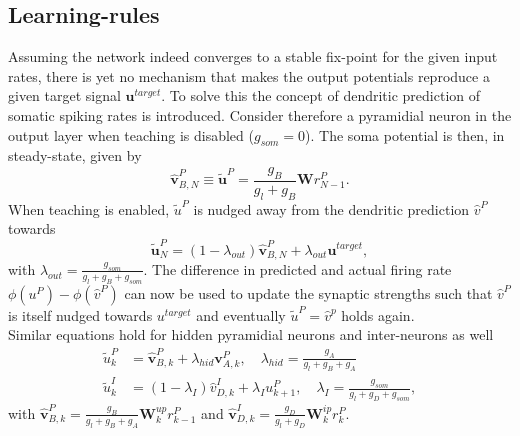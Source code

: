 \documentclass[12pt,a4paper]{article}
\begin{document}
\subsection{Learning-rules}
Assuming the network indeed converges to a stable fix-point for the given input rates, there is yet no mechanism that makes the output potentials reproduce a given target signal $\bm{u}^{target}$. To solve this the concept of dendritic prediction of somatic spiking rates is introduced. Consider therefore a pyramidial neuron in the output layer when teaching is disabled ($g_{som}=0$). The soma potential is then, in steady-state, given by
\begin{equation}
\hat{\bm{v}}^P_{B,N} \equiv \tilde{\bm{u}}^P = \frac{g_B}{g_l + g_B}\bm{W}r^P_{N-1}.
\end{equation} 
When teaching is enabled, $\tilde{u}^P$ is nudged away from the dendritic prediction $\hat{v}^P$ towards
\begin{equation}
\tilde{\bm{u}}^P_N = (1-\lambda_{out})\hat{\bm{v}}^P_{B,N} + \lambda_{out}\bm{u}^{target},
\end{equation}
with $\lambda_{out} = \frac{g_{som}}{g_l + g_B + g_{som}}$.
The difference in predicted and actual firing rate $\phi(u^P) - \phi(\hat{v}^P)$ can now be used to update the synaptic strengths such that $\hat{v}^P$ is itself nudged towards $u^{target}$ and eventually $\tilde{u}^P = \hat{v}^p$ holds again.\\
Similar equations hold for hidden pyramidial neurons and inter-neurons as well
\begin{align}
\tilde{u}^P_k &= \hat{\bm{v}}^P_{B,k} + \lambda_{hid}\bm{v}^P_{A,k}, \quad \lambda_{hid} = \frac{g_A}{g_l + g_B + g_A}\\
\tilde{u}^I_k &= (1-\lambda_I)\hat{v}^I_{D,k} + \lambda_{I}u^P_{k+1}, \quad \lambda_{I} = \frac{g_{som}}{g_l + g_D + g_{som}},
\end{align}
with $\hat{\bm{v}}^P_{B,k} = \frac{g_B}{g_l + g_B + g_A}\bm{W}^{up}_kr^P_{k-1}$ and $\hat{\bm{v}}^I_{D,k} = \frac{g_D}{g_l + g_D}\bm{W}^{ip}_kr^P_k$.\\
\end{document}
